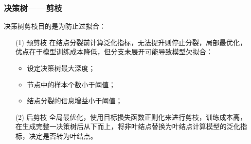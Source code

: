 \documentclass[usenames,dvipsnames]{beamer}
\begin{document}
\begin{frame}
\frametitle{决策树——剪枝}
决策树剪枝目的是为防止过拟合：\vskip 0.36cm
\begin{itemize}
  \item[(1)] 预剪枝\vskip 0.20cm
  在结点分裂前计算泛化指标，无法提升则停止分裂，局部最优化，优点在于模型训练成本降低，但分支未展开可能导致模型欠拟合：
      \begin{itemize}
        \item 设定决策树最大深度；
        \item 节点中的样本个数小于阈值；
        \item 结点分裂的信息增益小于阈值；
      \end{itemize}
\vskip 0.20cm
  \item[(2)] 后剪枝\vskip 0.20cm
  全局最优化，使用目标损失函数正则化来进行剪枝，训练成本高，在生成完整一决策树后从下而上，将非叶结点替换为叶结点计算模型的泛化指标，决定是否转为叶结点。
\end{itemize}
\end{frame}
\end{document}
